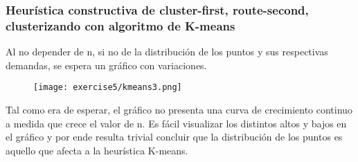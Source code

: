 \subsubsection{Heurística constructiva de cluster-first, route-second, clusterizando con algoritmo de K-means}


Al no depender de n, si no de la distribución de los puntos y sus respectivas demandas, se espera un gráfico con variaciones.

\begin{figure}[H]
	\centering
	\texttt{[image: exercise5/kmeans3.png]}
\end{figure}

Tal como era de esperar, el gráfico no presenta una curva de crecimiento continuo a medida que crece el valor de n. Es fácil visualizar los distintos altos y bajos en el gráfico y por ende resulta trivial concluir que la distribución de los puntos es aquello que afecta a la heurística K-means.